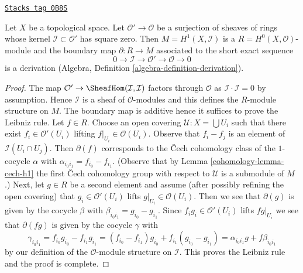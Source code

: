 \begin{lemma}
\label{cohomology-lemma-boundary-derivation-over-cup-product}
\href{https://stacks.math.columbia.edu/tag/0B8S}{\texttt{Stacks tag 0B8S}}

Let $X$ be a topological space. Let $\mathcal{O}' \to \mathcal{O}$ be a
surjection of sheaves of rings whose kernel $\mathcal{I} \subset \mathcal{O}'$
has square zero. Then $M = H^1(X, \mathcal{I})$ is a
$R = H^0(X, \mathcal{O})$-module and the boundary map
$\partial : R \to M$ associated to the short exact sequence
$$
0 \to \mathcal{I} \to \mathcal{O}' \to \mathcal{O} \to 0
$$
is a derivation (Algebra, Definition \ref{algebra-definition-derivation}).
\end{lemma}

\begin{proof}

The map $\mathcal{O}' \to \SheafHom(\mathcal{I}, \mathcal{I})$
factors through $\mathcal{O}$ as $\mathcal{I} \cdot \mathcal{I} = 0$
by assumption. Hence $\mathcal{I}$ is a sheaf of $\mathcal{O}$-modules
and this defines the $R$-module structure on $M$.
The boundary map is additive hence it suffices to prove
the Leibniz rule. Let $f \in R$. Choose an open covering
$\mathcal{U} : X = \bigcup U_i$ such that there exist
$f_i \in \mathcal{O}'(U_i)$ lifting $f|_{U_i} \in \mathcal{O}(U_i)$.
Observe that $f_i - f_j$ is an element of $\mathcal{I}(U_i \cap U_j)$.
Then $\partial(f)$ corresponds to the {\v C}ech cohomology class of
the $1$-cocycle $\alpha$ with $\alpha_{i_0i_1} = f_{i_0} - f_{i_1}$.
(Observe that by Lemma \ref{cohomology-lemma-cech-h1} the first {\v C}ech cohomology
group with respect to $\mathcal{U}$ is a submodule of $M$.)
Next, let $g \in R$ be a second element and assume (after possibly
refining the open covering) that $g_i \in \mathcal{O}'(U_i)$ lifts
$g|_{U_i} \in \mathcal{O}(U_i)$. Then we see that
$\partial(g)$ is given by the cocycle $\beta$ with
$\beta_{i_0i_1} = g_{i_0} - g_{i_1}$. Since $f_ig_i \in \mathcal{O}'(U_i)$
lifts $fg|_{U_i}$ we see that
$\partial(fg)$ is given by the cocycle $\gamma$ with
$$
\gamma_{i_0i_1} = f_{i_0}g_{i_0} - f_{i_1}g_{i_1} =
(f_{i_0} - f_{i_1})g_{i_0} + f_{i_1}(g_{i_0} - g_{i_1}) =
\alpha_{i_0i_1}g + f\beta_{i_0i_1}
$$
by our definition of the $\mathcal{O}$-module structure on $\mathcal{I}$.
This proves the Leibniz rule and the proof is complete.
\end{proof}

